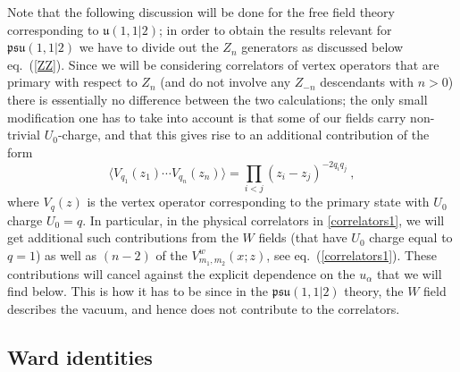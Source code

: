 \documentclass[a4paper,11pt]{article}
\numberwithin{equation}{section}
\def\be{\begin{equation}}
\def\ee{\end{equation}}
\begin{document}
Note that the following discussion will be done for the free field theory corresponding to $\mathfrak{u}(1,1|2)$; in order to obtain the results relevant for $\mathfrak{psu}(1,1|2)$ we have to divide out the $Z_n$ generators as discussed below eq.~(\ref{ZZ}). Since we will be considering correlators of vertex operators that are primary with respect to $Z_n$ (and do not involve any $Z_{-n}$ descendants with $n>0$) there is essentially no difference between the two calculations; the only small modification one has to take into account is  that some of our fields carry non-trivial $U_0$-charge, and that this gives rise to an additional contribution of the form 
\be\label{ufactor}
\langle V_{q_1}(z_1) \cdots V_{q_n} (z_n) \rangle = \prod_{i<j} (z_i - z_j)^{- 2 q_i q_j} \ ,
\ee
where $V_q(z)$ is the vertex operator corresponding to the primary state with $U_0$ charge $U_0=q$. In particular, in the physical correlators in \eqref{correlators1}, we will get additional such contributions from the $W$ fields (that have $U_0$ charge equal to $q=1$) as well as $(n-2)$ of the $V^{w}_{m_1, m_2}(x; z)$, see eq.~(\ref{correlators1}). These contributions will cancel against the explicit dependence on the $u_{\alpha}$ that we will find below. This is how it has to be since in the $\mathfrak{psu}(1,1|2)$ theory, the $W$ field describes the vacuum, and hence does not contribute to the correlators.




\subsection{Ward identities}\label{sec:Ward}
\end{document}
